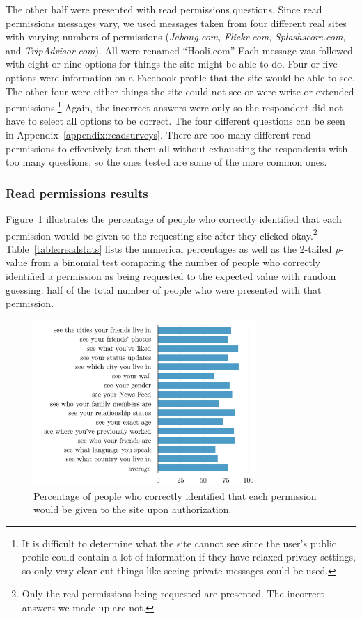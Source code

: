 \documentclass[10pt]{sig-alternate-10pt}
\begin{document}
The other half were presented with read permissions questions. Since read permissions messages vary, we used messages taken from four different real sites with varying numbers of permissions (\emph{Jabong.com}, \emph{Flickr.com}, \emph{Splashscore.com}, and \emph{TripAdvisor.com}). All were renamed ``Hooli.com'' Each message was followed with eight or nine options for things the site might be able to do. Four or five options were information on a Facebook profile that the site would be able to see. The other four were either things the site could not see or were write or extended permissions.\footnote{It is difficult to determine what the site cannot see since the user's public profile could contain a lot of information if they have relaxed privacy settings, so only very clear-cut things like seeing private messages could be used.} Again, the incorrect answers were only so the respondent did not have to select all options to be correct. The four different questions can be seen in Appendix~\ref{appendix:readsurveys}. There are too many different read permissions to effectively test them all without exhausting the respondents with too many questions, so the ones tested are some of the more common ones.

\subsubsection{Read permissions results}

Figure~\ref{figure:readpercents} illustrates the percentage of people who correctly identified that each permission would be given to the requesting site after they clicked okay.\footnote{Only the real permissions being requested are presented. The incorrect answers we made up are not.} Table~\ref{table:readstats} lists the numerical percentages as well as the 2-tailed \emph{p}-value from a binomial test comparing the number of people who correctly identified a permission as being requested to the expected value with random guessing: half of the total number of people who were presented with that permission.

\begin{figure}[h!]
  \centering
  \includegraphics[width=8.5cm]{read_percents_cosn}
  \caption{Percentage of people who correctly identified that each permission would be given to the site upon authorization.}
  \label{figure:readpercents}
\end{figure}
\end{document}
